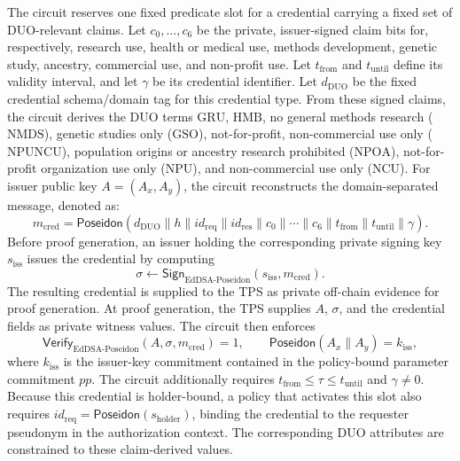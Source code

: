 The circuit reserves one fixed predicate slot for a credential carrying a fixed set of DUO-relevant claims.
Let $c_0,\ldots,c_6$ be the private, issuer-signed claim bits for, respectively, research use, health or medical use, methods development, genetic study, ancestry, commercial use, and non-profit use.
Let $t_{\mathrm{from}}$ and $t_{\mathrm{until}}$ define its validity interval, and let $\gamma$ be its credential identifier.
Let $d_{\mathrm{DUO}}$ be the fixed credential schema/domain tag for this credential type.
From these signed claims, the circuit derives the DUO terms $\mathrm{GRU}$, $\mathrm{HMB}$, no general methods research ($\mathrm{NMDS}$), genetic studies only ($\mathrm{GSO}$), not-for-profit, non-commercial use only ($\mathrm{NPUNCU}$), population origins or ancestry research prohibited ($\mathrm{NPOA}$), not-for-profit organization use only ($\mathrm{NPU}$), and non-commercial use only ($\mathrm{NCU}$).
For issuer public key $A=(A_x,A_y)$, the circuit reconstructs the domain-separated message, denoted as:
\begin{equation}
	m_{\mathrm{cred}}=\mathsf{Poseidon}(d_{\mathrm{DUO}}\parallel h\parallel
	\mathit{id}_{\mathrm{req}}\parallel\mathit{id}_{\mathrm{res}}\parallel
	c_0\parallel\cdots\parallel c_6\parallel
	t_{\mathrm{from}}\parallel t_{\mathrm{until}}\parallel\gamma).
\end{equation}
Before proof generation, an issuer holding the corresponding private signing key $s_{\mathrm{iss}}$ issues the credential by computing
\begin{equation}
	\sigma\leftarrow\mathsf{Sign}_{\mathrm{EdDSA\text{-}Poseidon}}(s_{\mathrm{iss}},m_{\mathrm{cred}}).
\end{equation}
The resulting credential is supplied to the TPS as private off-chain evidence for proof generation.
At proof generation, the TPS supplies $A$, $\sigma$, and the credential fields as private witness values.
The circuit then enforces
\begin{equation}
	\mathsf{Verify}_{\mathrm{EdDSA\text{-}Poseidon}}(A,\sigma,m_{\mathrm{cred}})=1,
	\qquad
	\mathsf{Poseidon}(A_x\parallel A_y)=k_{\mathrm{iss}},
\end{equation}
where $k_{\mathrm{iss}}$ is the issuer-key commitment contained in the policy-bound parameter commitment $\mathit{pp}$.
The circuit additionally requires $t_{\mathrm{from}}\leq\tau\leq t_{\mathrm{until}}$ and $\gamma\neq0$.
Because this credential is holder-bound, a policy that activates this slot also requires $\mathit{id}_{\mathrm{req}}=\mathsf{Poseidon}(s_{\mathrm{holder}})$, binding the credential to the requester pseudonym in the authorization context. The corresponding DUO attributes are constrained to these claim-derived values.

